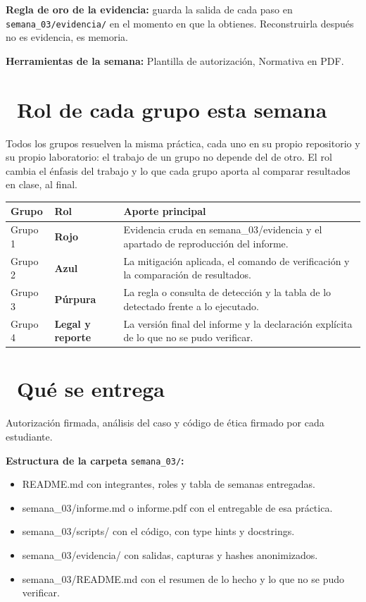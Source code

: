 \documentclass[11pt,a4paper]{article}
\newcommand{\iconotexto}[2]{\textcolor{cyanNeon}{\faIcon{#1}}~#2}
\begin{document}
\begin{cajaConcepto}\textbf{Regla de oro de la evidencia:} guarda la salida de cada paso en \texttt{semana\_03/evidencia/} en el momento en que la obtienes. Reconstruirla después no es evidencia, es memoria.
\end{cajaConcepto}

\textbf{Herramientas de la semana:} Plantilla de autorización, Normativa en PDF.

\section{\iconotexto{users}{Rol de cada grupo esta semana}}

Todos los grupos resuelven la misma práctica, cada uno en su propio repositorio y su propio laboratorio: el trabajo de un grupo no depende del de otro. El rol cambia el énfasis del trabajo y lo que cada grupo aporta al comparar resultados en clase, al final.

\begin{tabularx}{\linewidth}{@{}l l X@{}}
\toprule
Grupo & Rol & Aporte principal\\
\midrule
Grupo 1 & \textbf{Rojo} & Evidencia cruda en semana\_03/evidencia y el apartado de reproducción del informe. \\
Grupo 2 & \textbf{Azul} & La mitigación aplicada, el comando de verificación y la comparación de resultados. \\
Grupo 3 & \textbf{Púrpura} & La regla o consulta de detección y la tabla de lo detectado frente a lo ejecutado. \\
Grupo 4 & \textbf{Legal y reporte} & La versión final del informe y la declaración explícita de lo que no se pudo verificar. \\
\bottomrule
\end{tabularx}

\section{\iconotexto{box-open}{Qué se entrega}}

Autorización firmada, análisis del caso y código de ética firmado por cada estudiante.

\textbf{Estructura de la carpeta} \texttt{semana\_03/}\textbf{:}

\begin{itemize}[leftmargin=1.4em,itemsep=2pt,topsep=3pt]
  \item README.md con integrantes, roles y tabla de semanas entregadas.
  \item semana\_03/informe.md o informe.pdf con el entregable de esa práctica.
  \item semana\_03/scripts/ con el código, con type hints y docstrings.
  \item semana\_03/evidencia/ con salidas, capturas y hashes anonimizados.
  \item semana\_03/README.md con el resumen de lo hecho y lo que no se pudo verificar.
\end{itemize}
\end{document}
